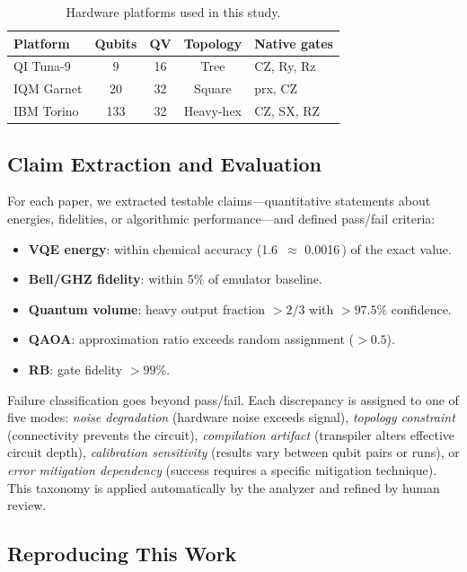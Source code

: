 \documentclass[twocolumn,prl,superscriptaddress,nofootinbib]{revtex4-2}
\newcommand{\Ha}{\,\text{Ha}}
\newcommand{\kcalmol}{\,\text{kcal/mol}}
\begin{document}
\begin{table}[b]
\caption{Hardware platforms used in this study.}
\label{tab:platforms}
\begin{ruledtabular}
\begin{tabular}{lcccl}
Platform & Qubits & QV & Topology & Native gates \\
\midrule
QI Tuna-9 & 9 & 16 & Tree & CZ, Ry, Rz \\
IQM Garnet & 20 & 32 & Square & prx, CZ \\
IBM Torino & 133 & 32 & Heavy-hex & CZ, SX, RZ \\
\end{tabular}
\end{ruledtabular}
\end{table}

\subsection{Claim Extraction and Evaluation}

For each paper, we extracted testable claims---quantitative statements about energies, fidelities, or algorithmic performance---and defined pass/fail criteria:
\begin{itemize}
  \item \textbf{VQE energy}: within chemical accuracy (1.6\kcalmol{} $\approx$ 0.0016\Ha) of the exact value.
  \item \textbf{Bell/GHZ fidelity}: within 5\% of emulator baseline.
  \item \textbf{Quantum volume}: heavy output fraction $> 2/3$ with $> 97.5\%$ confidence.
  \item \textbf{QAOA}: approximation ratio exceeds random assignment ($> 0.5$).
  \item \textbf{RB}: gate fidelity $> 99\%$.
\end{itemize}

\noindent
Failure classification goes beyond pass/fail.
Each discrepancy is assigned to one of five modes: \emph{noise degradation} (hardware noise exceeds signal), \emph{topology constraint} (connectivity prevents the circuit), \emph{compilation artifact} (transpiler alters effective circuit depth), \emph{calibration sensitivity} (results vary between qubit pairs or runs), or \emph{error mitigation dependency} (success requires a specific mitigation technique).
This taxonomy is applied automatically by the analyzer and refined by human review.

\subsection{Reproducing This Work}
\end{document}

